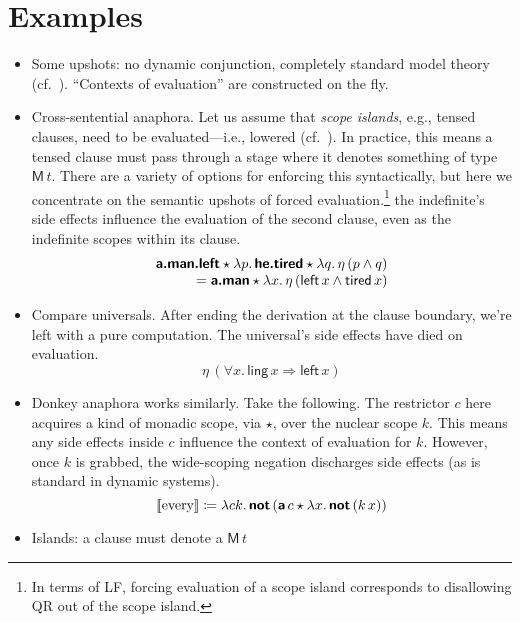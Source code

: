 \section{Examples}
\begin{itemize}
	\item Some upshots: no dynamic conjunction, completely standard model theory (cf.~\citealt{Groote:2006}). ``Contexts of evaluation'' are constructed on the fly. %
	
	\item Cross-sentential anaphora. Let us assume that \emph{scope islands}, e.g., tensed clauses, need to be evaluated---i.e., lowered (cf.~\citealt{Barker:2002, BarkerShan:2008}). In practice, this means a tensed clause must pass through a stage where it denotes something of type $\textsf{M}\,t$. There are a variety of options for enforcing this syntactically, but here we concentrate on the semantic upshots of forced evaluation.\footnote{In terms of LF, forcing evaluation of a scope island corresponds to disallowing QR out of the scope island.} the indefinite's side effects influence the evaluation of the second clause, even as the indefinite scopes within its clause. %
	\[\begin{array}{r}
		\bsf{a.man.left} \star \lambda p.\,\bsf{he.tired} \star \lambda q.\,\eta\,(p \wedge q)%
		\\
		= \bsf{a.man} \star \lambda x.\,\eta\,(\textsf{left}\,x \wedge \textsf{tired}\,x)%
	\end{array}\]
	
	\item Compare universals. After ending the derivation at the clause boundary, we're left with a pure computation. The universal's side effects have died on evaluation.%
	\[\eta\,(\forall x.\,\textsf{ling}\,x \Rightarrow \textsf{left}\,x)\]
	
	\item Donkey anaphora works similarly. Take the following. The restrictor $c$ here acquires a kind of monadic scope, via $\star$, over the nuclear scope $k$. This means any side effects inside $c$ influence the context of evaluation for $k$. However, once $k$ is grabbed, the wide-scoping negation discharges side effects (as is standard in dynamic systems). %
	\[\left [\!\left [ \text{every} \right ]\!\right ] \coloneqq \lambda ck.\,\textbf{\textsf{not}}\,(\textbf{\textsf{a}}\,c \star \lambda x.\,\textbf{\textsf{not}}\,(k\,x))\]%
	
	\item Islands: a clause must denote a $\textsf{M}\,t$
\end{itemize}

